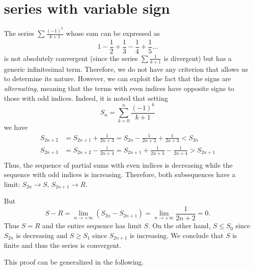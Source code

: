 \section{series with variable sign}
\label{sec:serie_segno_variabile}

The series $\sum \frac{(-1)^k}{k+1}$ whose sum can be expressed as
%
%
\[
1 - \frac{1}{2} + \frac{1}{3} - \frac{1}{4} +  \frac{1}{5} \dots
\]
is not absolutely convergent
(since the series $\sum \frac 1 {k+1}$ is divergent) but has a generic
infinitesimal term.
Therefore, we do not have any criterion that allows us to determine its nature.
However, we can exploit the fact that the signs are \emph{alternating}, meaning
that the terms with even indices have opposite signs to those with odd indices.
Indeed, it is noted that setting
\[
  S_n = \sum_{k=0}^n \frac{(-1)^k}{k+1}
\]
we have
\begin{align*}
S_{2n+2}
  &= S_{2n+1} + \frac{1}{2n+3}
  = S_{2n} - \frac{1}{2n+2} + \frac{1}{2n+3}
  < S_{2n}\\
S_{2n+3}
  &= S_{2n+2} - \frac{1}{2n+4}
  = S_{2n+1} + \frac{1}{2n+3} - \frac{1}{2n+4}
  > S_{2n+1} \\
\end{align*}
Thus, the sequence of partial sums with even indices is decreasing while
the sequence with odd indices is increasing. Therefore, both
subsequences have a limit: $S_{2n} \to S$, $S_{2n+1} \to R$.

But
\[
    S - R = \lim_{n\to +\infty} (S_{2n} - S_{2n+1}) =
  \lim_{n\to+\infty}\frac{1}{2n+2} = 0.
\]
Thus $S=R$ and the entire sequence has limit $S$.
On the other hand, $S \le S_0$ since $S_{2n}$ is decreasing and $S\ge S_1$ since
$S_{2n+1}$ is increasing.
We conclude that $S$ is finite and thus the series is convergent.%

This proof can be generalized in the following.

